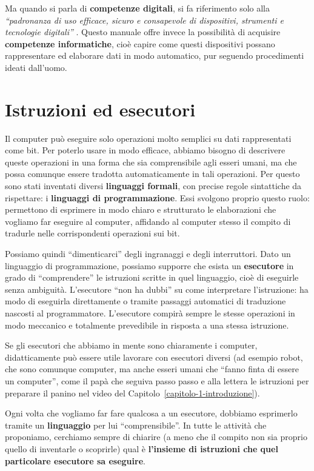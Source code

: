 Ma quando si parla di \textbf{competenze digitali}, si fa riferimento solo alla \emph{``padronanza di uso efficace, sicuro e consapevole di dispositivi, strumenti e tecnologie digitali''} \parencite{mim-indicazioni-2025}. Questo manuale offre invece la possibilità di acquisire \textbf{competenze informatiche}, cioè capire come questi dispositivi possano rappresentare ed elaborare dati in modo automatico, pur seguendo procedimenti ideati dall'uomo.


\section{Istruzioni ed esecutori }\label{istruzioni-ed-esecutori}

Il computer può eseguire solo operazioni molto semplici su dati rappresentati come bit. Per poterlo usare in modo efficace, abbiamo bisogno di descrivere queste operazioni in una forma che sia comprensibile agli esseri umani, ma che possa comunque essere tradotta automaticamente in tali operazioni. Per questo sono stati inventati diversi \textbf{linguaggi formali}, con precise regole sintattiche da rispettare: i \textbf{linguaggi di programmazione}. Essi svolgono proprio questo ruolo: permettono di esprimere in modo chiaro e strutturato le elaborazioni che vogliamo far eseguire al computer, affidando al computer stesso il compito di tradurle nelle corrispondenti operazioni sui bit.

Possiamo quindi ``dimenticarci'' degli ingranaggi e degli interruttori. Dato un linguaggio di programmazione, possiamo supporre che esista un \textbf{esecutore} in grado di ``comprendere'' le istruzioni scritte in quel linguaggio, cioè di eseguirle senza ambiguità. L'esecutore ``non ha dubbi'' su come interpretare l'istruzione: ha modo di eseguirla direttamente o tramite passaggi automatici di traduzione nascosti al programmatore. L'esecutore compirà sempre le stesse operazioni in modo meccanico e totalmente prevedibile in risposta a una stessa istruzione.

Se gli esecutori che abbiamo in mente sono chiaramente i computer, didatticamente può essere utile lavorare con esecutori diversi (ad esempio robot, che sono comunque computer, ma anche esseri umani che ``fanno finta di essere un computer'', come il papà che seguiva passo passo e alla lettera le istruzioni per preparare il panino nel video del Capitolo~\ref{capitolo-1-introduzione}).

Ogni volta che vogliamo far fare qualcosa a un esecutore, dobbiamo esprimerlo tramite un \textbf{linguaggio} per lui ``comprensibile''. In tutte le attività che proponiamo, cerchiamo sempre di chiarire (a meno che il compito non sia proprio quello di inventarle o scoprirle) qual è \textbf{l'insieme di istruzioni che quel particolare esecutore sa eseguire}.

